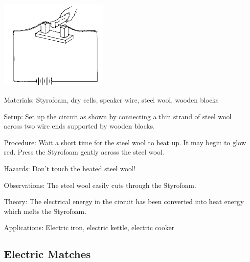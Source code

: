 \begin{multicols}{2}
\begin{center}
\includegraphics[width=0.4\textwidth]{./img/source/heat-current.png}
\end{center}

\begin{description*}
\item[Materials:]{Styrofoam, dry cells, speaker wire, steel wool, wooden blocks}
\item[Setup:]{Set up the circuit as shown by connecting a thin strand of steel wool across two wire ends supported by wooden blocks.}
\item[Procedure:]{Wait a short time for the steel wool to heat up. It may begin to glow red. Press the Styrofoam gently across the steel wool.}
\item[Hazards:]{Don't touch the heated steel wool!}
\item[Observations:]{The steel wool easily cuts through the Styrofoam.}
\item[Theory:]{The electrical energy in the circuit has been converted into heat energy which melts the Styrofoam.}
\item[Applications:]{Electric iron, electric kettle, electric cooker}
\end{description*}

\subsection{Electric Matches}



\end{multicols}
